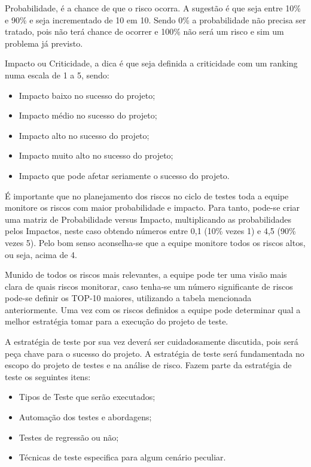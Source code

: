 Probabilidade, é a chance de que o risco ocorra. A sugestão é que seja entre 10\% e 90\% e seja incrementado de 10 em 10. Sendo 0\% a probabilidade não precisa ser tratado, pois não terá chance de ocorrer e 100\% não será um risco e sim um problema já previsto.

Impacto ou Criticidade, a dica é que seja definida a criticidade com um ranking numa escala de 1 a 5, sendo:

\begin{itemize}
\item Impacto baixo no sucesso do projeto;
\item Impacto médio no sucesso do projeto;
\item Impacto alto no sucesso do projeto;
\item Impacto muito alto no sucesso do projeto;
\item Impacto que pode afetar seriamente o sucesso do projeto.
\end{itemize}

É importante que no planejamento dos riscos no ciclo de testes toda a equipe monitore os riscos com maior probabilidade e impacto. Para tanto, pode-se criar uma matriz de Probabilidade versus Impacto, multiplicando as probabilidades pelos Impactos, neste caso obtendo números entre 0,1 (10\% vezes 1) e 4,5 (90\% vezes 5). Pelo bom senso aconselha-se que a equipe monitore todos os riscos altos, ou seja, acima de 4.

Munido de todos os riscos mais relevantes, a equipe pode ter uma visão mais clara de quais riscos monitorar, caso tenha-se um número significante de riscos pode-se definir os TOP-10 maiores, utilizando a tabela mencionada anteriormente. Uma vez com os riscos definidos a equipe pode determinar qual a melhor estratégia tomar para a execução do projeto de teste.

A estratégia de teste por sua vez deverá ser cuidadosamente discutida, pois será peça chave para o sucesso do projeto. A estratégia de teste será fundamentada no escopo do projeto de testes e na análise de risco. Fazem parte da estratégia de teste os seguintes itens:

\begin{itemize}
\item Tipos de Teste que serão executados;
\item Automação dos testes e abordagens;
\item Testes de regressão ou não;
\item Técnicas de teste especifica para algum cenário peculiar.
\end{itemize}


